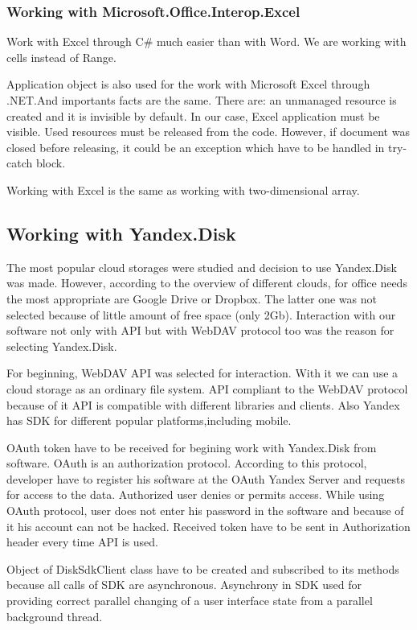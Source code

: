 \documentclass[12pt,journal,compsoc]{D:/Магистратура/English/bare_conf/IEEEtran}
\begin{document}
\subsubsection{Working with Microsoft.Office.Interop.Excel}
Work with Excel through C\# much easier than with Word. We are working with cells instead of Range.

Application object is also used for the work with Microsoft Excel through .NET.And importants facts are the same. There are: an unmanaged resource is created and it is invisible by default. In our case, Excel application must be visible. Used resources must be released from the code. However, if document was closed before releasing, it could be an exception which have to be handled in try-catch block.

Working with Excel is the same as working with two-dimensional array.

\subsection{Working with Yandex.Disk}
The most popular cloud storages were studied and decision to use Yandex.Disk was made. However, according to the overview of different clouds, for office needs the most appropriate are Google Drive or Dropbox. The latter one was not selected because of little amount of free space (only 2Gb). Interaction with our software not only with API but with WebDAV protocol too was the reason for selecting Yandex.Disk.

For beginning, WebDAV API was selected for interaction. With it we can use a cloud storage as an ordinary file system. API compliant to the WebDAV protocol because of it API is compatible with different libraries and clients. Also Yandex has SDK for different popular platforms,including mobile.

OAuth token have to be received for begining work with Yandex.Disk from software. OAuth is an authorization protocol. According to this protocol, developer have to register his software at the OAuth Yandex Server and requests for access to the data. Authorized user denies or permits access. While using OAuth protocol, user does not enter his password in the software and because of it his account can not be hacked. Received token have to be sent in Authorization header every time API is used.

Object of DiskSdkClient class have to be created and subscribed to its methods because all calls of SDK are asynchronous. Asynchrony in SDK used for providing correct parallel changing of a user interface state from a parallel background thread.
\end{document}
